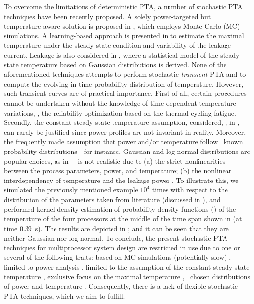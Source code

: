 

To overcome the limitations of deterministic PTA, a number of stochastic PTA techniques have been recently proposed. A solely power-targeted but temperature-aware solution is proposed in \cite{chandra2010}, which employs Monte Carlo (MC) simulations. A learning-based approach is presented in \cite{juan2011} to estimate the maximal temperature under the steady-state condition and variability of the leakage current. Leakage is also considered in \cite{juan2012}, where a statistical model of the steady-state temperature based on Gaussian distributions is derived. None of the aforementioned techniques attempts to perform stochastic \emph{transient} PTA and to compute the evolving-in-time probability distribution of temperature. However, such transient curves are of practical importance. First of all, certain procedures cannot be undertaken without the knowledge of time-dependent temperature variations, \eg, the reliability optimization based on the thermal-cycling fatigue. Secondly, the constant steady-state temperature assumption, considered, \eg, in \cite{juan2011, juan2012}, can rarely be justified since power profiles are not invariant in reality. Moreover, the frequently made assumption that power and/or temperature follow \apriori\ known probability distributions---for instance, Gaussian and log-normal distributions are popular choices, as in \cite{juan2012, srivastava2010}---is not realistic due to (a) the strict nonlinearities between the process parameters, power, and temperature; (b) the nonlinear interdependency of temperature and the leakage power \cite{liu2007}. To illustrate this, we simulated the previously mentioned example $10^4$ times with respect to the distribution of the parameters taken from literature (discussed in ), and performed kernel density estimation of probability density functions (\pdfs) of the temperature of the four processors at the middle of the time span shown in  (at time 0.39~s). The results are depicted in ; and it can be seen that they are neither Gaussian nor log-normal. To conclude, the present stochastic PTA techniques for multiprocessor system design are restricted in use due to one or several of the following traits: based on MC simulations (potentially slow) \cite{chandra2010}, limited to power analysis \cite{chandra2010}, limited to the assumption of the constant steady-state temperature \cite{juan2011, juan2012}, exclusive focus on the maximal temperature \cite{juan2011}, \apriori\ chosen distributions of power and temperature \cite{juan2012, srivastava2010}. Consequently, there is a lack of flexible stochastic PTA techniques, which we aim to fulfill.

